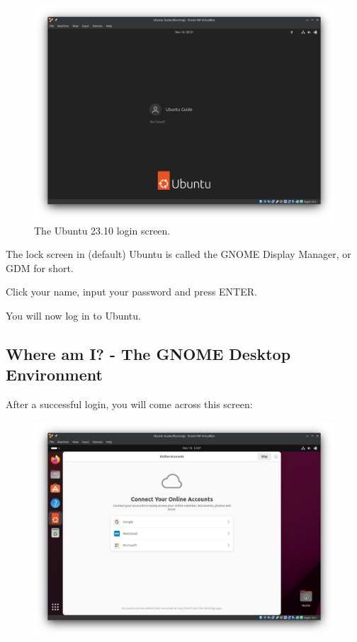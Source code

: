 \documentclass[12pt]{article}
\begin{document}
\begin{figure}[htp]
    \centering
    \includegraphics[width=\textwidth]{1-14.png}
    \caption*{The Ubuntu 23.10 login screen.}
\end{figure}

The lock screen in (default) Ubuntu is called the GNOME Display Manager, or GDM for short.

Click your name, input your password and press ENTER.

You will now log in to Ubuntu.

\pagebreak

\subsection{Where am I? - The GNOME Desktop Environment}

After a successful login, you will come across this screen:

\begin{figure}[htp]
    \centering
    \includegraphics[width=\textwidth]{2-1.png}
\end{figure}
\end{document}
